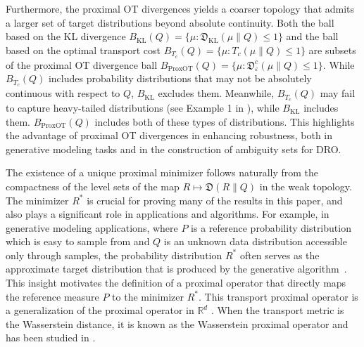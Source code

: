 \documentclass{amsart}
\newcommand{\rb}[1]{#1} %
\newcommand{\R}{\mathbb{R}}
\theoremstyle{definition}
\theoremstyle{remark}
\numberwithin{equation}{section}
\begin{document}
\rb{Furthermore, the proximal OT divergences yields a coarser topology that admits a larger set of target distributions beyond absolute continuity.} 
Both the ball based on the KL divergence $B_{\mathrm{KL}}(Q)=\{\mu:\mathfrak{D}_{\mathrm{KL}}(\mu\|Q)\leq 1 \}$ and the ball based on the optimal transport cost $B_{T_c}(Q)=\{\mu:T_c(\mu\|Q)\leq 1 \}$ are subsets of the proximal OT divergence ball $B_{\mathrm{Prox OT}}(Q)=\{\mu:\mathfrak{D}^c_\varepsilon(\mu\|Q)\leq 1 \}$. While $B_{T_c}(Q)$ includes probability distributions that may not be absolutely continuous with respect to $Q$, $B_{\mathrm{KL}}$ excludes them. Meanwhile, $B_{T_c}(Q)$ may fail to capture heavy-tailed distributions (see Example 1 in \cite{chen2024learning}), while $B_{\mathrm{KL}}$ includes them. $B_{\mathrm{Prox OT}}(Q)$ includes both of these types of distributions. This highlights the advantage of proximal OT divergences in enhancing robustness, both in generative modeling tasks and in the construction of ambiguity sets for DRO.

        

The existence of a unique proximal minimizer follows naturally from the compactness of the level sets of the map $R \mapsto \mathfrak{D}(R\|Q)$ in the weak topology.  The minimizer $R^*$ is crucial for proving many of the results in this paper, and also plays a significant role in applications and algorithms. For example, in generative modeling applications, where $P$ is a reference probability distribution which is easy to sample from and $Q$ is an unknown data distribution accessible only through samples, the probability distribution $R^*$  often serves as the approximate target distribution that is produced by the generative algorithm~\cite{onken2021ot,finlay2020train,gu2024combining}. This insight motivates the definition of a proximal operator that directly maps the reference measure $P$ to the minimizer $R^*$. This transport proximal operator is a generalization of the proximal operator in $\R^d$ \cite{parikh2014proximal}. When the transport metric is the Wasserstein distance, it is known as the Wasserstein proximal operator and has been studied in \cite{li2023kernel}.
\end{document}
